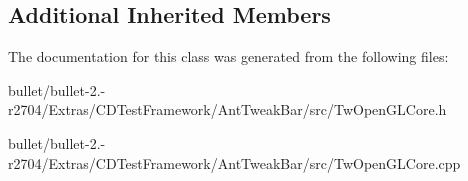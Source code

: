 \subsection*{Additional Inherited Members}


The documentation for this class was generated from the following files\+:\begin{DoxyCompactItemize}
\item 
bullet/bullet-\/2.-\/r2704/\+Extras/\+C\+D\+Test\+Framework/\+Ant\+Tweak\+Bar/src/Tw\+Open\+G\+L\+Core.\+h\item 
bullet/bullet-\/2.-\/r2704/\+Extras/\+C\+D\+Test\+Framework/\+Ant\+Tweak\+Bar/src/Tw\+Open\+G\+L\+Core.\+cpp\end{DoxyCompactItemize}

